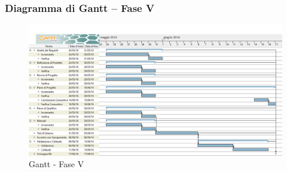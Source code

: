 \documentclass[../PianoProgetto.tex]{subfiles}
\begin{document}
		\subsubsection{Diagramma di Gantt – Fase V}
			\begin{figure}[!h]
				\centering
				\includegraphics[width=\textwidth]{gantt_png/7-verifica}
				\caption{Gantt - Fase V}
				\label{fig:Gantt - Fase V}
			\end{figure}
			
\end{document}
